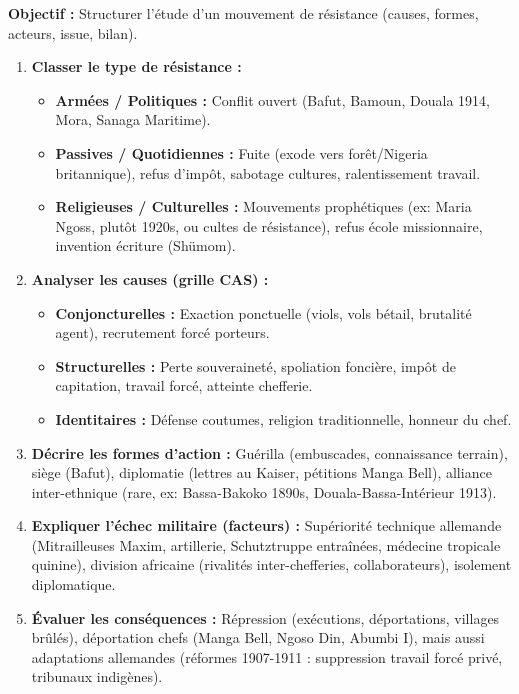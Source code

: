\documentclass[11pt]{article}
\newcommand{\cle}[1]{{\popxbold\color{popdark}#1}}
\begin{document}
\begin{methode}
\textbf{Objectif :} Structurer l'étude d'un mouvement de résistance (causes, formes, acteurs, issue, bilan).
\begin{enumerate}
    \item \textbf{Classer le type de résistance :}
    \begin{itemize}
        \item \textbf{Armées / Politiques :} Conflit ouvert (Bafut, Bamoun, Douala 1914, Mora, Sanaga Maritime).
        \item \textbf{Passives / Quotidiennes :} Fuite (exode vers forêt/Nigeria britannique), refus d'impôt, sabotage cultures, ralentissement travail.
        \item \textbf{Religieuses / Culturelles :} Mouvements prophétiques (ex: Maria Ngoss, plutôt 1920s, ou cultes de résistance), refus école missionnaire, invention écriture (Shümom).
    \end{itemize}
    \item \textbf{Analyser les causes (grille CAS) :}
    \begin{itemize}
        \item \textbf{Conjoncturelles :} Exaction ponctuelle (viols, vols bétail, brutalité agent), recrutement forcé porteurs.
        \item \textbf{Structurelles :} Perte souveraineté, spoliation foncière, impôt de capitation, travail forcé, atteinte chefferie.
        \item \textbf{Identitaires :} Défense coutumes, religion traditionnelle, honneur du chef.
    \end{itemize}
    \item \textbf{Décrire les formes d'action :} Guérilla (embuscades, connaissance terrain), siège (Bafut), diplomatie (lettres au Kaiser, pétitions Manga Bell), alliance inter-ethnique (rare, ex: Bassa-Bakoko 1890s, Douala-Bassa-Intérieur 1913).
    \item \textbf{Expliquer l'échec militaire (facteurs) :} Supériorité technique allemande (Mitrailleuses \cle{Maxim}, artillerie, \cle{Schutztruppe} entraînées, médecine tropicale quinine), division africaine (rivalités inter-chefferies, collaborateurs), isolement diplomatique.
    \item \textbf{Évaluer les conséquences :} Répression (exécutions, déportations, villages brûlés), déportation chefs (Manga Bell, Ngoso Din, Abumbi I), mais aussi adaptations allemandes (réformes 1907-1911 : suppression travail forcé privé, tribunaux indigènes).
\end{enumerate}
\end{methode}
\end{document}

